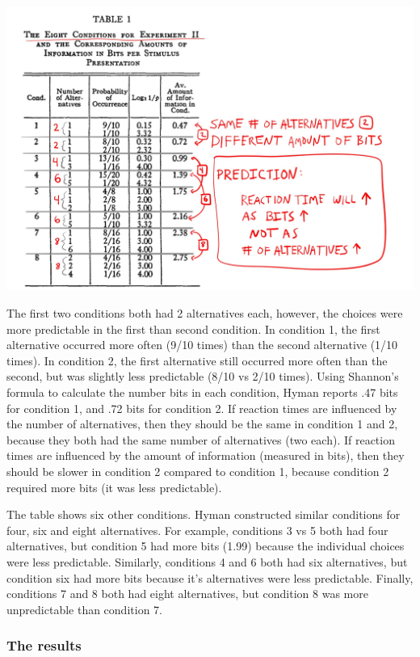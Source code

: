 \documentclass[
  oneside,
  12pt]{crumpbook}
\begin{document}
\begin{center}\includegraphics[width=1\linewidth]{imgs/Hyman_e2} \end{center}

The first two conditions both had 2 alternatives each, however, the choices were more predictable in the first than second condition. In condition 1, the first alternative occurred more often (9/10 times) than the second alternative (1/10 times). In condition 2, the first alternative still occurred more often than the second, but was slightly less predictable (8/10 vs 2/10 times). Using Shannon's formula to calculate the number bits in each condition, Hyman reports .47 bits for condition 1, and .72 bits for condition 2. If reaction times are influenced by the number of alternatives, then they should be the same in condition 1 and 2, because they both had the same number of alternatives (two each). If reaction times are influenced by the amount of information (measured in bits), then they should be slower in condition 2 compared to condition 1, because condition 2 required more bits (it was less predictable).

The table shows six other conditions. Hyman constructed similar conditions for four, six and eight alternatives. For example, conditions 3 vs 5 both had four alternatives, but condition 5 had more bits (1.99) because the individual choices were less predictable. Similarly, conditions 4 and 6 both had six alternatives, but condition six had more bits because it's alternatives were less predictable. Finally, conditions 7 and 8 both had eight alternatives, but condition 8 was more unpredictable than condition 7.

\hypertarget{the-results}{%
\subsubsection{The results}\label{the-results}}
\end{document}
